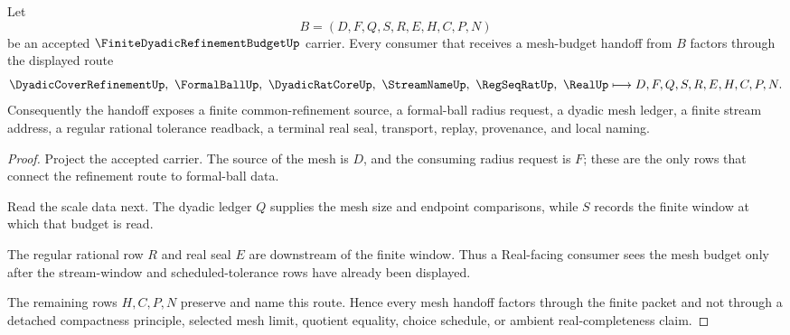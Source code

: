 \begin{theorem}
\label{thm:finite-dyadic-refinement-budget-mesh-handoff}
Let
$$
B=(D,F,Q,S,R,E,H,C,P,N)
$$
be an accepted $\FiniteDyadicRefinementBudgetUp$ carrier. Every consumer that receives a mesh-budget handoff from $B$ factors through the displayed route
$$
\DyadicCoverRefinementUp,\ \FormalBallUp,\ \DyadicRatCoreUp,\ \StreamNameUp,\ \RegSeqRatUp,\ \RealUp
\longmapsto D,F,Q,S,R,E,H,C,P,N .
$$
Consequently the handoff exposes a finite common-refinement source, a formal-ball radius request, a dyadic mesh ledger, a finite stream address, a regular rational tolerance readback, a terminal real seal, transport, replay, provenance, and local naming.
\end{theorem}
\begin{proof}
Project the accepted carrier. The source of the mesh is $D$, and the consuming radius request is $F$; these are the only rows that connect the refinement route to formal-ball data.

Read the scale data next. The dyadic ledger $Q$ supplies the mesh size and endpoint comparisons, while $S$ records the finite window at which that budget is read.

The regular rational row $R$ and real seal $E$ are downstream of the finite window. Thus a Real-facing consumer sees the mesh budget only after the stream-window and scheduled-tolerance rows have already been displayed.

The remaining rows $H,C,P,N$ preserve and name this route. Hence every mesh handoff factors through the finite packet and not through a detached compactness principle, selected mesh limit, quotient equality, choice schedule, or ambient real-completeness claim.
\end{proof}

